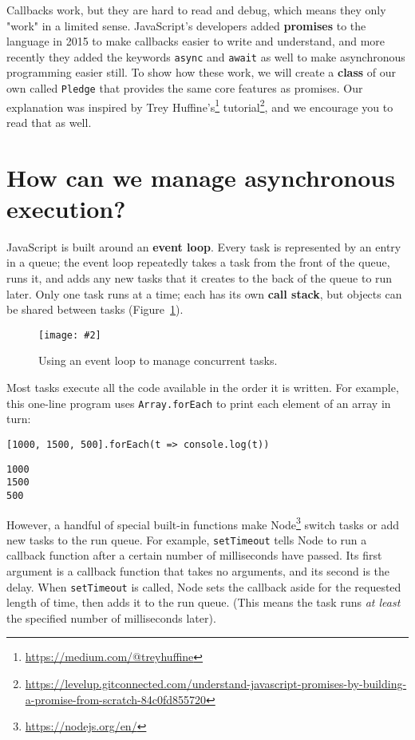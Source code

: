 \documentclass[krantzl]{krantz}
\newcommand{\figpdf}[4]{\begin{figure}%
\centering%
\texttt{[image: \#2]}%
\caption{#3}%
\label{#1}%
\end{figure}}
\newcommand{\figref}[1]{Figure~\ref{#1}}
\newcommand{\glossref}[1]{\textbf{#1}}
\newcommand{\hreffoot}[2]{{#1}\footnote{\href{#2}{#2}}}
\begin{document}
Callbacks work,
but they are hard to read and debug,
which means they only "work" in a limited sense.
JavaScript's developers added \glossref{promises} to the language in 2015
to make callbacks easier to write and understand,
and more recently they added the keywords \texttt{async} and \texttt{await} as well
to make asynchronous programming easier still.
To show how these work,
we will create a \glossref{class} of our own called \texttt{Pledge}
that provides the same core features as promises.
Our explanation was inspired by \hreffoot{Trey Huffine's}{https://medium.com/@treyhuffine} \hreffoot{tutorial}{https://levelup.gitconnected.com/understand-javascript-promises-by-building-a-promise-from-scratch-84c0fd855720},
and we encourage you to read that as well.

\section{How can we manage asynchronous execution?}\label{async-programming-manage}


JavaScript is built around an \glossref{event loop}.
Every task is represented by an entry in a queue;
the event loop repeatedly takes a task from the front of the queue,
runs it,
and adds any new tasks that it creates to the back of the queue to run later.
Only one task runs at a time;
each has its own \glossref{call stack},
but objects can be shared between tasks
(\figref{async-programming-event-loop}).

\figpdf{async-programming-event-loop}{./async-programming/event-loop.pdf}{Using an event loop to manage concurrent tasks.}{0.6}


Most tasks execute all the code available in the order it is written.
For example,
this one-line program uses \texttt{Array.forEach}
to print each element of an array in turn:


\begin{lstlisting}[frame=single,frameround=tttt]
[1000, 1500, 500].forEach(t => console.log(t))
\end{lstlisting}



\begin{lstlisting}[frame=single,frameround=tttt]
1000
1500
500
\end{lstlisting}



However,
a handful of special built-in functions make \hreffoot{Node}{https://nodejs.org/en/} switch tasks
or add new tasks to the run queue.
For example,
\texttt{setTimeout} tells Node to run a callback function
after a certain number of milliseconds have passed.
Its first argument is a callback function that takes no arguments,
and its second is the delay.
When \texttt{setTimeout} is called,
Node sets the callback aside for the requested length of time,
then adds it to the run queue.
(This means the task runs \emph{at least} the specified number of milliseconds later).
\end{document}

